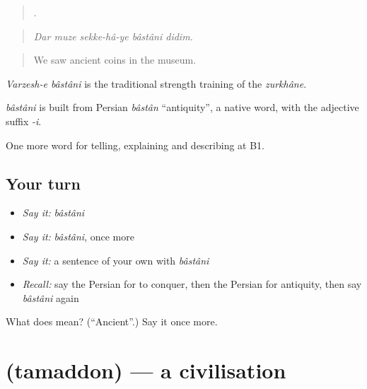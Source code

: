 \begin{quote}
     .
\end{quote}

\begin{quote}
\emph{Dar muze sekke-hâ-ye bâstâni didim.}
\end{quote}

\begin{quote}
We saw ancient coins in the museum.
\end{quote}

\emph{Varzesh-e bâstâni} is the traditional strength training of the \emph{zurkhâne}.

\begin{cousinweb}
\emph{bâstâni} is built from Persian \emph{bâstân} \textquotedblleft{}antiquity\textquotedblright{}, a native word, with the adjective suffix \emph{-i}.
\end{cousinweb}

\begin{grammarlens}[title={What you've built}]
One more word for telling, explaining and describing at B1.
\end{grammarlens}

\subsection*{Your turn}
\begin{itemize}
\raggedright
  \item \emph{Say it:} \emph{bâstâni}
  \item \emph{Say it:} \emph{bâstâni}, once more
  \item \emph{Say it:} a sentence of your own with \emph{bâstâni}
  \item \emph{Recall:} say the Persian for to conquer, then the Persian for antiquity, then say \emph{bâstâni} again
\end{itemize}

\begin{tcolorbox}[breakable,colback=teal!4,colframe=teal!35!black,title={Before you move on}]
What does  mean? (\textquotedblleft{}Ancient\textquotedblright{}.) Say it once more.
\end{tcolorbox}
\section[\texorpdfstring{\fa{تمدن} (tamaddon)}{تمدن (tamaddon)}]{ (tamaddon) — a civilisation}

